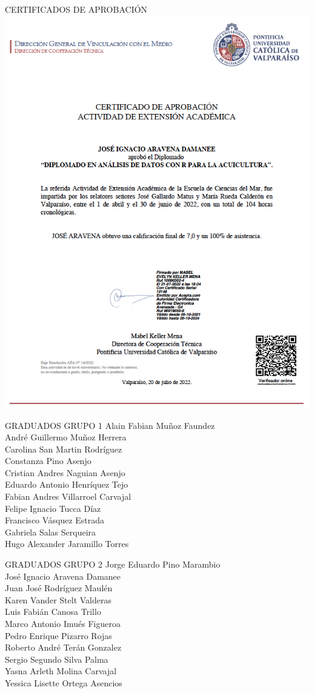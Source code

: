 \documentclass[
  ignorenonframetext,
]{beamer}
\begin{document}
\begin{frame}{CERTIFICADOS DE APROBACIÓN}
\protect\hypertarget{certificados-de-aprobaciuxf3n}{}
\includegraphics[width=0.7\linewidth]{Certificado}
\end{frame}

\begin{frame}{GRADUADOS GRUPO 1}
\protect\hypertarget{graduados-grupo-1}{}
Alain Fabian Muñoz Faundez\\
André Guillermo Muñoz Herrera\\
Carolina San Martin Rodríguez\\
Constanza Pino Asenjo\\
Cristian Andres Naguian Asenjo\\
Eduardo Antonio Henríquez Tejo\\
Fabian Andres Villarroel Carvajal\\
Felipe Ignacio Tucca Díaz\\
Francisco Vásquez Estrada\\
Gabriela Salas Serqueira\\
Hugo Alexander Jaramillo Torres
\end{frame}

\begin{frame}{GRADUADOS GRUPO 2}
\protect\hypertarget{graduados-grupo-2}{}
Jorge Eduardo Pino Marambio\\
José Ignacio Aravena Damanee\\
Juan José Rodríguez Maulén\\
Karen Vander Stelt Valderas\\
Luis Fabián Canosa Trillo\\
Marco Antonio Imués Figueroa\\
Pedro Enrique Pizarro Rojas\\
Roberto André Terán Gonzalez\\
Sergio Segundo Silva Palma\\
Yasna Arleth Molina Carvajal\\
Yessica Lisette Ortega Asencios
\end{frame}
\end{document}
